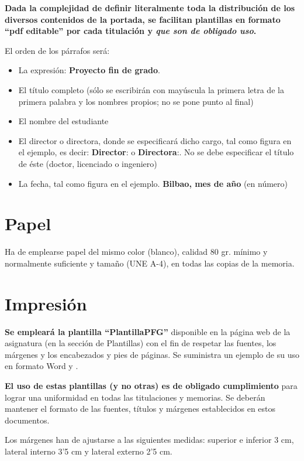 \textbf{Dada la complejidad de definir literalmente toda la distribución de los diversos contenidos de la
portada, se facilitan plantillas en formato \enquote{pdf editable} por cada titulación y \emph{que son de
obligado uso}.}

El orden de los párrafos será:
\begin{itemize}
  \item La expresión: \textbf{Proyecto fin de grado}.
  \item El título completo (sólo se escribirán con mayúscula la primera letra de la primera palabra
        y los nombres propios; no se pone punto al final)
  \item El nombre del estudiante
  \item El director o directora, donde se especificará dicho cargo, tal como figura en el ejemplo, es
        decir: \textbf{Director}: o \textbf{Directora}:. No se debe especificar el título de éste (doctor, licenciado o
        ingeniero)
  \item  La fecha, tal como figura en el ejemplo. \textbf{Bilbao, mes de año} (en número)
\end{itemize}

\section{Papel}

Ha de emplearse papel del mismo color (blanco), calidad 80 gr. mínimo y normalmente suficiente y
tamaño (UNE A-4), en todas las copias de la memoria.

\section{Impresi\'on}

\textbf{Se empleará la plantilla \enquote{PlantillaPFG}} disponible en la página web de la asignatura (en la sección
de Plantillas) con el fin de respetar las fuentes, los márgenes y los encabezados y pies de páginas.
Se suministra un ejemplo de su uso en formato Word y .

\textbf{El uso de estas plantillas (y no otras) es de obligado cumplimiento} para lograr una uniformidad en
todas las titulaciones y memorias. Se deberán mantener el formato de las fuentes, títulos y
márgenes establecidos en estos documentos.

Los márgenes han de ajustarse a las siguientes medidas: superior e inferior 3 cm, lateral interno 3’5
cm y lateral externo 2’5 cm.

